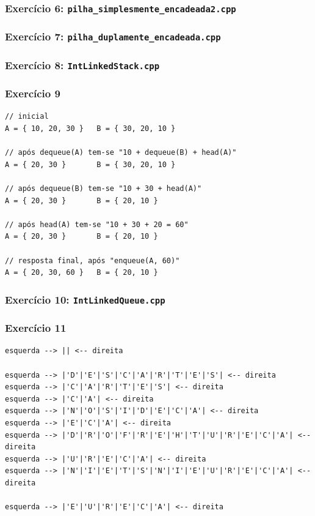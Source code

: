\documentclass[aspectratio=169]{beamer}
\begin{document}
\begin{frame}[fragile]\frametitle{Exercício 6: \texttt{pilha\_simplesmente\_encadeada2.cpp}}
\fontsize{6pt}{6pt}\selectfont{

}
\end{frame}

\begin{frame}[fragile]\frametitle{Exercício 7: \texttt{pilha\_duplamente\_encadeada.cpp}}
\fontsize{5pt}{5pt}\selectfont{

}
\end{frame}

\begin{frame}[fragile]\frametitle{Exercício 8: \texttt{IntLinkedStack.cpp}}
\fontsize{3pt}{5pt}\selectfont{

}
\end{frame}

\begin{frame}[fragile]\frametitle{Exercício 9}
\small{
\begin{verbatim}
// inicial
A = { 10, 20, 30 }   B = { 30, 20, 10 }

// após dequeue(A) tem-se "10 + dequeue(B) + head(A)"
A = { 20, 30 }       B = { 30, 20, 10 }

// após dequeue(B) tem-se "10 + 30 + head(A)"
A = { 20, 30 }       B = { 20, 10 }

// após head(A) tem-se "10 + 30 + 20 = 60"
A = { 20, 30 }       B = { 20, 10 }

// resposta final, após "enqueue(A, 60)"
A = { 20, 30, 60 }   B = { 20, 10 }
\end{verbatim}
}
\end{frame}

\begin{frame}[fragile]\frametitle{Exercício 10: \texttt{IntLinkedQueue.cpp}}
\fontsize{3pt}{5pt}\selectfont{

}
\end{frame}

\begin{frame}[fragile]\frametitle{Exercício 11}
\small{
\begin{verbatim}
esquerda --> || <-- direita

esquerda --> |'D'|'E'|'S'|'C'|'A'|'R'|'T'|'E'|'S'| <-- direita
esquerda --> |'C'|'A'|'R'|'T'|'E'|'S'| <-- direita
esquerda --> |'C'|'A'| <-- direita
esquerda --> |'N'|'O'|'S'|'I'|'D'|'E'|'C'|'A'| <-- direita
esquerda --> |'E'|'C'|'A'| <-- direita
esquerda --> |'D'|'R'|'O'|'F'|'R'|'E'|'H'|'T'|'U'|'R'|'E'|'C'|'A'| <-- direita
esquerda --> |'U'|'R'|'E'|'C'|'A'| <-- direita
esquerda --> |'N'|'I'|'E'|'T'|'S'|'N'|'I'|'E'|'U'|'R'|'E'|'C'|'A'| <-- direita

esquerda --> |'E'|'U'|'R'|'E'|'C'|'A'| <-- direita
\end{verbatim}
}
\end{frame}
\end{document}
